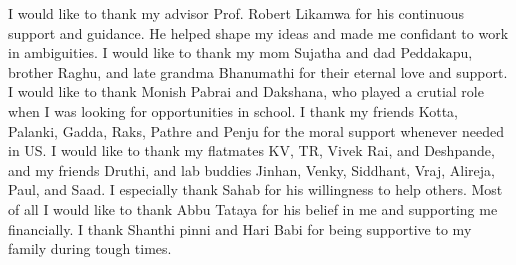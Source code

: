 \begin{acknowledgements}
		I would like to thank my advisor Prof. Robert Likamwa for his continuous support and guidance. He helped shape my ideas and made me confidant to work in ambiguities. I would like to thank my mom Sujatha and dad Peddakapu, brother Raghu, and late grandma Bhanumathi for their eternal love and support.	I would like to thank Monish Pabrai and Dakshana, who played a crutial role when I was looking for opportunities in school. 	I thank my friends Kotta, Palanki, Gadda, Raks, Pathre and Penju for  the moral support whenever needed in US. I would like to thank my flatmates KV, TR, Vivek Rai, and Deshpande, and my friends Druthi, and lab buddies Jinhan, Venky, Siddhant, Vraj, Alireja, Paul, and Saad. I especially thank Sahab for his willingness to help others. Most of all I would like to thank Abbu Tataya for his belief in me and supporting me financially. I thank Shanthi pinni and Hari Babi for being supportive to my family during tough times.  
	

\end{acknowledgements}